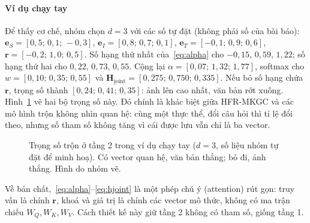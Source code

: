 \documentclass[conference,a4paper]{IEEEtran}
\newcommand{\Hj}{\mathbf{H}_{\mathrm{joint}}}
\begin{document}
\paragraph{Ví dụ chạy tay}
Để thấy cơ chế, nhóm chọn $d = 3$ với các số tự đặt (không phải số của bài báo):
$\mathbf{e}_S = [0{,}5;\,0{,}1;\,-0{,}3]$,
$\mathbf{e}_I = [0{,}8;\,0{,}7;\,0{,}1]$,
$\mathbf{e}_T = [-0{,}1;\,0{,}9;\,0{,}6]$,
$\mathbf{r} = [-0{,}2;\,1{,}0;\,0{,}5]$.
Số hạng thứ nhất của~\eqref{eq:alpha} cho $-0{,}15$, $0{,}59$, $1{,}22$; số hạng thứ hai cho $0{,}22$, $0{,}73$, $0{,}55$. Cộng lại $\alpha = [0{,}07;\,1{,}32;\,1{,}77]$, softmax cho $w = [0{,}10;\,0{,}35;\,0{,}55]$ và $\Hj = [0{,}275;\,0{,}750;\,0{,}335]$. Nếu bỏ số hạng chứa $\mathbf{r}$, trọng số thành $[0{,}24;\,0{,}41;\,0{,}35]$: ảnh lên cao nhất, văn bản rớt xuống. Hình~\ref{fig:weights} vẽ hai bộ trọng số này. Đó chính là khác biệt giữa HFR-MKGC và các mô hình trộn không nhìn quan hệ: cùng một thực thể, đổi câu hỏi thì tỉ lệ đổi theo, nhưng số tham số không tăng vì cái được lưu vẫn chỉ là ba vector.

\begin{figure}[t]
\centering
{}
\caption{Trọng số trộn ở tầng 2 trong ví dụ chạy tay ($d=3$, số liệu nhóm tự đặt để minh hoạ). Có vector quan hệ, văn bản thắng; bỏ đi, ảnh thắng. Hình do nhóm vẽ.}
\label{fig:weights}
\end{figure}

Về bản chất,~\eqref{eq:alpha}--\eqref{eq:hjoint} là một phép chú ý (attention) rút gọn: truy vấn là chính $\mathbf{r}$, khoá và giá trị là chính các vector mô thức, không có ma trận chiếu $W_Q, W_K, W_V$. Cách thiết kế này giữ tầng 2 không có tham số, giống tầng 1.
\end{document}
